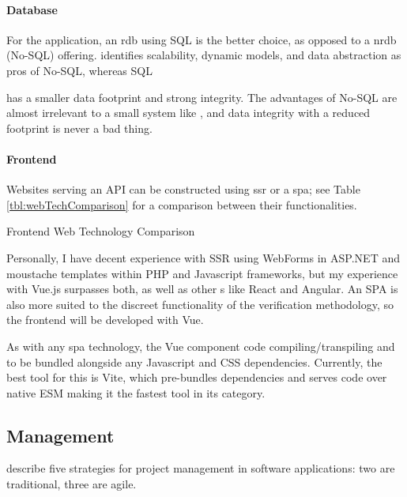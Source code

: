 \paragraph{Database}
For the \projectname{} application, an \gls{rdb} using SQL
is the better choice, as opposed to a \gls{nrdb} (No-SQL)
offering.
\cite{databaseComparison} identifies scalability, dynamic
models, and data abstraction as pros of No-SQL, whereas SQL

has a smaller data footprint and strong integrity.
The advantages of No-SQL are almost irrelevant to a small
system like \projectname{}, and data integrity with a
reduced footprint is never a bad thing.


\paragraph{Frontend}
Websites serving an API can be constructed using \gls{ssr}
or a \gls{spa}; see Table \ref{tbl:webTechComparison} for a
comparison between their functionalities.

\begin{table}[h]
  \centering
  \small
  
  \caption{Frontend Web Technology Comparison}
  \label{tbl:webTechComparison}
\end{table}

Personally, I have decent experience with SSR using
WebForms in ASP.NET and moustache templates within PHP and
Javascript frameworks, but my experience with Vue.js
surpasses both, as well as other s like React and
Angular.
An SPA is also more suited to the discreet functionality of
the verification methodology, so the frontend will be
developed with Vue.

As with any \gls{spa} technology, the Vue component code
compiling/transpiling and to be bundled alongside 
any Javascript and CSS dependencies. Currently, the best 
tool for this is Vite, which pre-bundles dependencies and
serves code over native ESM making it the fastest tool in
its category. 



\subsection{Management}

\cite{agileVsTraditional} describe five strategies for
project management in software applications: two are
traditional, three are agile.

